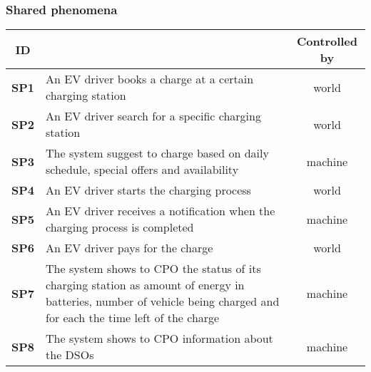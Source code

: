 \subsubsection{Shared phenomena}
\begin{table}[H]
    \centering
    \begin{tabularx}{\textwidth}{c|X|c}
        \toprule
        ID            &                                                                                                                                                                       & Controlled by \\ \midrule
        \textbf{SP1}  & An EV driver books a charge at a certain charging station                                                                                                             & world         \\ \midrule
        \textbf{SP2}  & An EV driver search for a specific charging station                                                                                                                   & world         \\ \midrule
        \textbf{SP3}  & The system suggest to charge based on daily schedule, special offers and availability                                                                                 & machine       \\ \midrule
        \textbf{SP4}  & An EV driver starts the charging process                                                                                                                              & world         \\ \midrule
        \textbf{SP5}  & An EV driver receives a notification when the charging process is completed                                                                                           & machine       \\ \midrule
        \textbf{SP6}  & An EV driver pays for the charge                                                                                                                                      & world         \\ \midrule
        \textbf{SP7}  & The system shows to CPO the status of its charging station as amount of energy in batteries, number of vehicle being charged and for each the time left of the charge & machine       \\ \midrule
        \textbf{SP8}  & The system shows to CPO information about the DSOs                                                                                                                    & machine       \\ \midrule

\end{tabularx}
\end{table}
